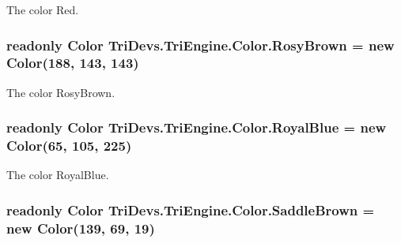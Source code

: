 The color Red. 

\hypertarget{struct_tri_devs_1_1_tri_engine_1_1_color_a4bce585a1257a48390f509f60ffe067c}{
\subsubsection[{Rosy\-Brown}]{\setlength{\rightskip}{0pt plus 5cm}readonly {\bf Color} Tri\-Devs.\-Tri\-Engine.\-Color.\-Rosy\-Brown = new {\bf Color}(188, 143, 143)\hspace{0.3cm}{\ttfamily [static]}}}\label{struct_tri_devs_1_1_tri_engine_1_1_color_a4bce585a1257a48390f509f60ffe067c}


The color Rosy\-Brown. 

\hypertarget{struct_tri_devs_1_1_tri_engine_1_1_color_ac98fc2cbcc98003e40959349b6a3c38f}{
\subsubsection[{Royal\-Blue}]{\setlength{\rightskip}{0pt plus 5cm}readonly {\bf Color} Tri\-Devs.\-Tri\-Engine.\-Color.\-Royal\-Blue = new {\bf Color}(65, 105, 225)\hspace{0.3cm}{\ttfamily [static]}}}\label{struct_tri_devs_1_1_tri_engine_1_1_color_ac98fc2cbcc98003e40959349b6a3c38f}


The color Royal\-Blue. 

\hypertarget{struct_tri_devs_1_1_tri_engine_1_1_color_abc7fe14501f5d94ee3b89dd2521077e7}{
\subsubsection[{Saddle\-Brown}]{\setlength{\rightskip}{0pt plus 5cm}readonly {\bf Color} Tri\-Devs.\-Tri\-Engine.\-Color.\-Saddle\-Brown = new {\bf Color}(139, 69, 19)\hspace{0.3cm}{\ttfamily [static]}}}\label{struct_tri_devs_1_1_tri_engine_1_1_color_abc7fe14501f5d94ee3b89dd2521077e7}


